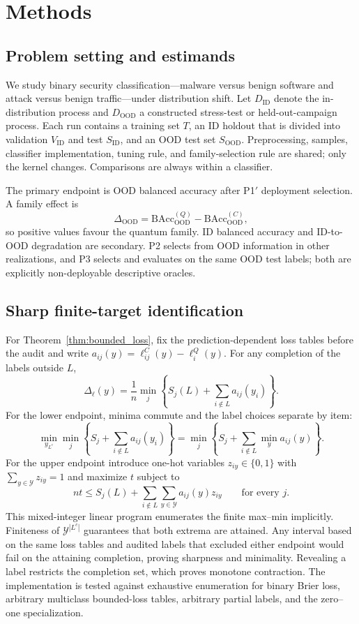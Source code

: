 \documentclass[referee,lineno,pdflatex,sn-nature]{sn-jnl}
\theoremstyle{thmstyleone}%
\theoremstyle{thmstyletwo}%
\theoremstyle{thmstylethree}%
\begin{document}
\section{Methods}
\label{sec:methods}

\subsection{Problem setting and estimands}

We study binary security classification---malware versus benign software and attack versus benign traffic---under distribution shift. Let $D_{\mathrm{ID}}$ denote the in-distribution process and $D_{\mathrm{OOD}}$ a constructed stress-test or held-out-campaign process. Each run contains a training set $T$, an ID holdout that is divided into validation $V_{\mathrm{ID}}$ and test $S_{\mathrm{ID}}$, and an OOD test set $S_{\mathrm{OOD}}$. Preprocessing, samples, classifier implementation, tuning rule, and family-selection rule are shared; only the kernel changes. Comparisons are always within a classifier.

The primary endpoint is OOD balanced accuracy after P1$'$ deployment selection. A family effect is
\[
\Delta_{\mathrm{OOD}}=
\mathrm{BAcc}^{(Q)}_{\mathrm{OOD}}-
\mathrm{BAcc}^{(C)}_{\mathrm{OOD}},
\]
so positive values favour the quantum family. ID balanced accuracy and ID-to-OOD degradation are secondary. P2 selects from OOD information in other realizations, and P3 selects and evaluates on the same OOD test labels; both are explicitly non-deployable descriptive oracles.

\subsection{Sharp finite-target identification}
\label{sec:methods_identification}

For Theorem~\ref{thm:bounded_loss}, fix the prediction-dependent loss tables before the audit and write $a_{ij}(y)=\ell_{ij}^C(y)-\ell_i^Q(y)$. For any completion of the labels outside $L$,
\[
\Delta_\ell(y)=\frac1n\min_j\left\{S_j(L)+
\sum_{i\notin L}a_{ij}(y_i)\right\}.
\]
For the lower endpoint, minima commute and the label choices separate by item:
\[
\min_{y_{L^c}}\min_j\left\{S_j+\sum_{i\notin L}a_{ij}(y_i)\right\}
=\min_j\left\{S_j+\sum_{i\notin L}\min_y a_{ij}(y)\right\}.
\]
For the upper endpoint introduce one-hot variables $z_{iy}\in\{0,1\}$ with $\sum_{y\in\mathcal Y}z_{iy}=1$ and maximize $t$ subject to
\[
nt\leq S_j(L)+\sum_{i\notin L}\sum_{y\in\mathcal Y}
a_{ij}(y)z_{iy}\qquad\text{for every }j.
\]
This mixed-integer linear program enumerates the finite max--min implicitly. Finiteness of $\mathcal Y^{|L^c|}$ guarantees that both extrema are attained. Any interval based on the same loss tables and audited labels that excluded either endpoint would fail on the attaining completion, proving sharpness and minimality. Revealing a label restricts the completion set, which proves monotone contraction. The implementation is tested against exhaustive enumeration for binary Brier loss, arbitrary multiclass bounded-loss tables, arbitrary partial labels, and the zero--one specialization.
\end{document}
